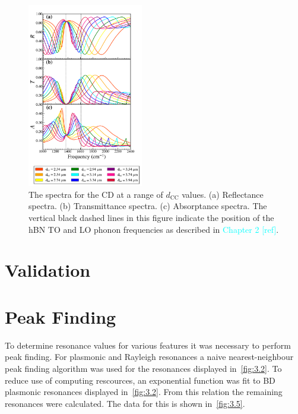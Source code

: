 \documentclass[preprint,
amsmath,amssymb,
aip,
jap,
floatfix,]{revtex4-2}
\begin{document}
			\begin{figure}[!htb]
			  \centering\includegraphics[width=0.45\textwidth]{Figures/FullRTA1000_2400.png}
			  \caption{The spectra for the CD at a range of $d_\mathrm{CC}$ values. (a) Reflectance spectra. (b) Transmittance spectra. (c) Absorptance spectra.  The vertical black dashed lines in this figure indicate the position of the hBN TO and LO phonon frequencies as described in \textcolor{cyan}{Chapter 2 [ref]}.}
			  \label{fig:3.4}
			\end{figure}


		\section{Validation}
		\label{sec:Val}

		\section{Peak Finding}
		\label{sec:PF}		
			To determine resonance values for various features it was necessary to perform peak finding. For plasmonic and Rayleigh resonances a naive nearest-neighbour peak finding algorithm was used for the resonances displayed in~\ref{fig:3.2}. To reduce use of computing rescources, an exponential function was fit to BD plasmonic resonances displayed in~\ref{fig:3.2}. From this relation the remaining resonances were calculated.  The data for this is shown in~\ref{fig:3.5}. 
\end{document}
